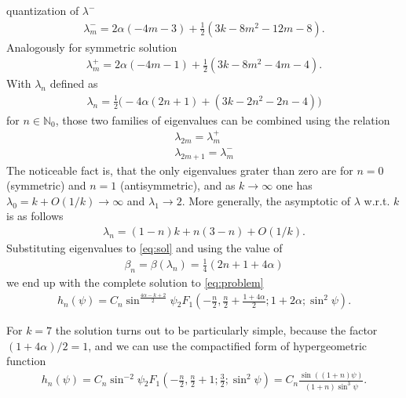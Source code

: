quantization of $\lambda^-$
\begin{gather}
  \lambda^-_m=2\alpha (-4 m-3)+\frac{1}{2}(3 k-8
  m^2-12 m-8).
\end{gather}
Analogously for symmetric solution
\begin{gather}
  \lambda^+_m=2\alpha(-4 m-1)+\frac{1}{2} (3 k-8
  m^2-4 m-4).
\end{gather}
With $\lambda_n$ defined as
\begin{gather}
  \lambda_n=\frac{1}{2}\big(-4\alpha(2n+1)+
  (3k-2n^2-2n-4)\big)
\end{gather}
for $n\in\mathbb{N}_0$, those two families of eigenvalues can be combined
using the relation
\begin{gather}
  \lambda_{2m}=\lambda_m^+\\
  \lambda_{2m+1}=\lambda_m^-
\end{gather}
The noticeable fact is, that the only eigenvalues grater than zero are
for $n=0$ (symmetric) and $n=1$ (antisymmetric), and as
$k\rightarrow\infty$ one has $\lambda_0= k + O(1/k)\rightarrow\infty$
and $\lambda_1\rightarrow 2$. More generally, the asymptotic of
$\lambda$ w.r.t. $k$ is as follows
\begin{gather}
  \lambda_n=(1-n)k+n(3-n)+O(1/k).
\end{gather}
Substituting eigenvalues to \eqref{eq:sol} and using the value of
\begin{gather}
  \beta_n=\beta(\lambda_n)=\frac{1}{4}(2n+1+4\alpha)
\end{gather}
we end up with the complete solution to \eqref{eq:problem}
\begin{gather}
  h_n(\psi)=C_n\sin^{\frac{4\alpha-k+2}{2}}\psi {}_2 F_1 (-\frac{n}{2},\frac{n}{2}+\frac{1+4\alpha}{2};1+2\alpha;\sin^2\psi).
\end{gather}


For $k=7$ the solution turns out to be particularly simple, because the
factor $(1+4\alpha)/2=1$, and we can use the compactified form of
hypergeometric function
\begin{gather}
  h_n(\psi)=C_n\sin^{-2}\psi
  {}_2F_1(-\frac{n}{2},\frac{n}{2}+1;\frac{3}{2};\sin^2\psi)
  =C_n\frac{\sin((1+n)\psi)}{(1+n)\sin^3\psi}.
\end{gather}

